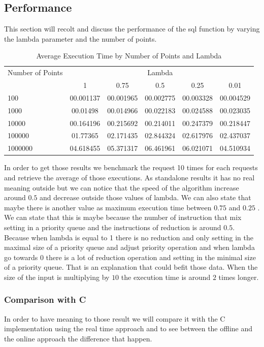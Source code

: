 \documentclass[twoside,12pt, a4paper]{report}
\begin{document}
\subsection{Performance}
This section will recolt and discuss the performance of the sql function by varying the lambda parameter and the number of points. 
\begin{table}[htbp]
	\centering
	\caption{Average Execution Time by Number of Points and Lambda}
	\label{tab:execution_time}
	\begin{tabular}{@{}lccccc@{}}
		\toprule
		Number of Points & \multicolumn{5}{c}{Lambda} \\
		\cmidrule{2-6}
		& 1         & 0.75       & 0.5        & 0.25       & 0.01       \\
		\midrule
		100              & 00.001137 & 00.001965 & 00.002775 & 00.003328 & 00.004529 \\
		1000             & 00.01498  & 00.014966 & 00.022183 & 00.024588 & 00.023035 \\
		10000            & 00.164196 & 00.215692 & 00.214011 & 00.247379 & 00.218447 \\
		100000           & 01.77365  & 02.171435 & 02.844324 & 02.617976 & 02.437037 \\
		1000000          & 04.618455 & 05.371317 & 06.461961 & 06.021071 & 04.510934 \\
		\bottomrule
	\end{tabular}
\end{table}

In order to get those results we benchmark the request 10 times for each requests and retrieve the average of those executions. As standalone results it has no real meaning outside but we can notice that the speed of the algorithm increase around $0.5$ and decrease outside those values of lambda. We can also state that maybe there is another value as maximum execution time between $0.75$ and $0.25$ . We can state that this is maybe because the number of instruction that mix setting in a priority queue and the instructions of reduction is around $0.5$. Because when lambda is equal to 1 there is no reduction and only setting in the maximal size of a priority queue and adjust priority operation and when lambda go towards $0$ there is a lot of reduction operation and setting in the minimal size of a priority queue. That is an explanation that could befit those data. When the size of the input is multiplying by $10$ the execution time is around $2$ times longer. 

\subsubsection{Comparison with C}
In order to have meaning to those result we will compare it with the C implementation using the real time approach and to see between the offline and the online approach the difference that happen.
\end{document}
